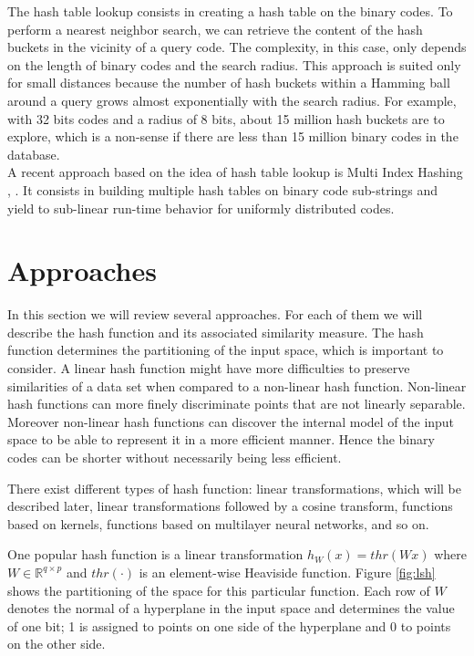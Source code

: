 The hash table lookup consists in creating a hash table on the binary codes. To perform a nearest neighbor search, we can retrieve the content of the hash buckets in the vicinity of a query code. The complexity, in this case, only depends on the length of binary codes and the search radius. This approach is suited only for small distances because the number of hash buckets within a Hamming ball around a query grows almost exponentially with the search radius. For example, with 32 bits codes and a radius of 8 bits, about 15 million hash buckets are to explore, which is a non-sense if there are less than 15 million binary codes in the database. \\
A recent approach based on the idea of hash table lookup is Multi Index Hashing \cite{norouzi2012fast}, \cite{norouzi2016}. It consists in building multiple hash tables on binary code sub-strings and yield to sub-linear run-time behavior for uniformly distributed codes.

\section{Approaches}
In this section we will review several approaches. For each of them we will describe the hash function and its associated similarity measure. The hash function determines the partitioning of the input space, which is important to consider. A linear hash function might have more difficulties to preserve similarities of a data set when compared to a non-linear hash function. Non-linear hash functions can more finely discriminate points that are not linearly separable. Moreover non-linear hash functions can discover the internal model of the input space to be able to represent it in a more efficient manner. Hence the binary codes can be shorter without necessarily being less efficient.

There exist different types of hash function: linear transformations, which will be described later, linear transformations followed by a cosine transform, functions based on kernels, functions based on multilayer neural networks, and so on.

One popular hash function is a linear transformation $h_W(x)=thr(Wx)$ where $W\in\mathbb{R}^{q\times{}p}$ and $thr(\cdot)$ is an element-wise Heaviside function. Figure \ref{fig:lsh} shows the partitioning of the space for this particular function. Each row of $W$ denotes the normal of a hyperplane in the input space and determines the value of one bit; 1 is assigned to points on one side of the hyperplane and 0 to points on the other side.

